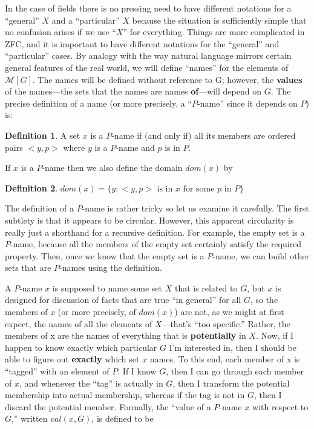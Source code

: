 \documentclass[10pt]{article}
\newcommand\axiom[1]{\textmd{#1}}
\theoremstyle{definition}
\newtheorem*{defn}{Definition}
\begin{document}
In the case of fields there is no pressing need to have different notations for a ``general'' $X$ and a ``particular'' $X$ because the situation is sufficiently simple that no confusion arises if we use ``$X$'' for everything. Things are more complicated in \axiom{ZFC}, and it is important to have different notations for the ``general'' and ``particular'' cases. By analogy with the way natural language mirrors certain general features of the real world, we will define ``names'' for the elements of $\mathcal{M}[G]$. The names will be defined without reference to G; however, the \textbf{values} of the names---the sets that the names are names \textbf{of}---will depend on $G$. The precise definition of a name (or more precisely, a ``$P$-name'' since it depends on $P$) is:

\begin{defn}
A set $x$ is a $P$-name if (and only if) all its members are ordered pairs $<y,p>$ where $y$ is a $P$-name and $p$ is in $P$.
\end{defn}

If $x$ is a $P$-name then we also define the domain $dom(x)$ by

\begin{defn}
$dom(x) = \{y : <y,p>\text{ is in }x\text{ for some }p\text{ in }P\}$
\end{defn}

The definition of a $P$-name is rather tricky so let us examine it carefully. The first subtlety is that it appears to be circular. However, this apparent circularity is really just a shorthand for a recursive definition. For example, the empty set is a $P$-name, because all the members of the empty set certainly satisfy the required property. Then, once we know that the empty set is a $P$-name, we can build other sets that are $P$-names using the definition.

A $P$-name $x$ is supposed to name some set $X$ that is related to $G$, but $x$ is designed for discussion of facts that are true ``in general'' for all $G$, so the members of $x$ (or more precisely, of $dom(x)$) are not, as we might at first expect, the names of all the elements of $X$---that's ``too specific.'' Rather, the members of x are the names of everything that is \textbf{potentially} in $X$. Now, if I happen to know exactly which particular $G$ I'm interested in, then I should be able to figure out \textbf{exactly} which set $x$ names. To this end, each member of x is ``tagged'' with an element of $P$. If I know $G$, then I can go through each member of $x$, and whenever the ``tag'' is actually in $G$, then I transform the potential membership into actual membership, whereas if the tag is not in $G$, then I discard the potential member. Formally, the ``value of a $P$-name $x$ with respect to $G$,'' written $val(x,G)$, is defined to be
\end{document}
